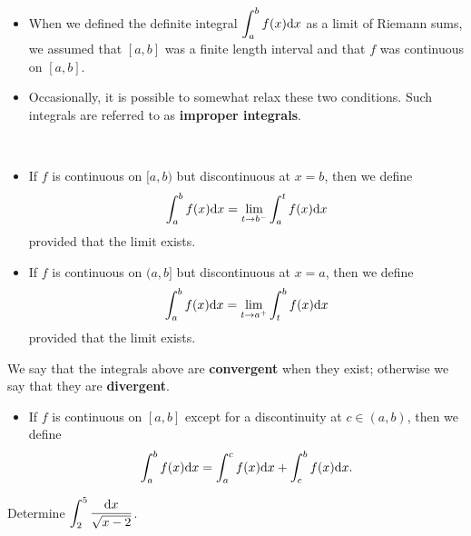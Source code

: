 

\begin{remark}\,
\begin{itemize}
\item When we defined the definite integral $\displaystyle\int_a^bf(x)\mathrm{d} x$ as a limit of Riemann sums, we assumed that $[a,b]$ was a finite length interval and that $f$ was continuous on $[a,b]$.
\item Occasionally, it is possible to somewhat relax these two conditions.
Such integrals are referred to as \textbf{improper integrals}.
\end{itemize}
\end{remark}

\begin{definition}\,
\begin{itemize}
\item If $f$ is continuous on $[a,b)$ but discontinuous at $x=b$, then we define
\begin{equation*}
\int_a^b f(x)\mathrm{d} x = \lim_{t\to b^-}\int_a^t f(x)\mathrm{d} x
\end{equation*}
provided that the limit exists.
\item If $f$ is continuous on $(a,b]$ but discontinuous at $x=a$, then we define
\begin{equation*}
\int_{a}^b f(x)\mathrm{d} x = \lim_{t\to a^+}\int_t^b f(x)\mathrm{d} x
\end{equation*}
provided that the limit exists.
\end{itemize}
We say that the integrals above are \textbf{convergent} when they exist; otherwise we say that they are \textbf{divergent}.
\begin{itemize}
\item If $f$ is continuous on $[a,b]$ except for a discontinuity at $c\in (a,b)$, then we define
\begin{equation*}
\int_{a}^b f(x)\mathrm{d} x = \int_{a}^cf(x)\mathrm{d} x + \int_c^b f(x)\mathrm{d} x.
\end{equation*}
\end{itemize}
\end{definition}

\begin{example}
Determine $\displaystyle\int_2^5\frac{\mathrm{d} x}{\sqrt{x-2}}$.
\end{example}

\ifdefined\SOLUTION
\SOLUTION{
The integrand is continuous on $(2,5]$ but discontinuous at $x=2$.
Therefore,
\begin{equation*}
\begin{split}
\int_2^5\frac{\dee x}{\sqrt{x-2}} 
&= \lim_{a\to 2^+}\int_a^5(x-2)^{-1/2}\dee x\\
&=\lim_{a\to 2^+}2(x-2)^{1/2}\Big|_a^5\\
&=2\lim_{a\to 2^+}\left(\sqrt 3 -\sqrt{a-2}\right)\\
&= 2\sqrt 3.
\end{split}
\end{equation*}
}
\fi


